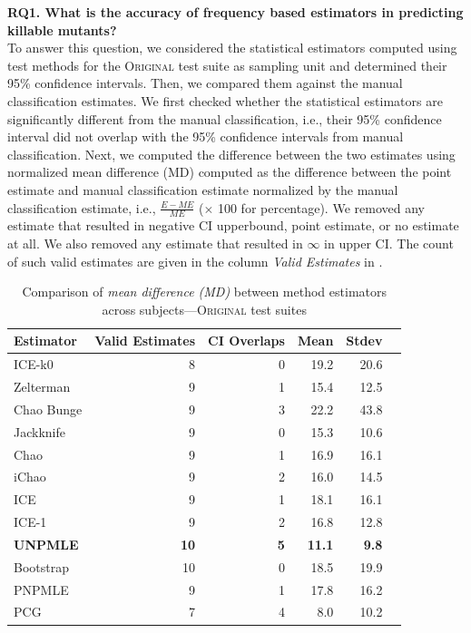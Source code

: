 \documentclass[sigconf,review,anonymous]{acmart}
\newcommand{\ICEallrare}{ICE-k0\xspace}
\newcommand{\Zelterman}{Zelterman\xspace}
\newcommand{\ChaoBunge}{Chao Bunge\xspace}
\newcommand{\Jackknife}{Jackknife\xspace}
\newcommand{\Chao}{Chao\xspace}
\newcommand{\improvedChao}{iChao\xspace}
\newcommand{\ICE}{ICE\xspace}
\newcommand{\improvedICE}{ICE-1\xspace}
\newcommand{\Unpmle}{UNPMLE\xspace}
\newcommand{\Bootstrap}{Bootstrap\xspace}
\newcommand{\Pnpmle}{PNPMLE\xspace}
\newcommand{\PCG}{PCG\xspace}
\newcommand{\original}{\textsc{Original}\xspace}
\newcommand{\B}[1]{\textbf{#1}}
\begin{document}
\noindent\textbf{RQ1.
What is the accuracy of frequency based estimators in predicting killable mutants?}\\
%
To answer this question, we considered the statistical estimators computed
using test methods for the \original test suite as sampling unit and determined
their 95\% confidence intervals. Then, we compared them against the manual
classification estimates.
%
We first checked whether the statistical estimators are significantly different
from the manual classification, i.e.,  their 95\% confidence interval did not overlap
with the 95\% confidence intervals from manual classification. Next, we computed
the difference between the two estimates using normalized mean difference (MD) computed as the
difference between the point estimate and manual classification estimate
normalized by the manual classification estimate, i.e., $\frac{E - ME}{ME}$ ($\times$
100 for percentage). We removed any estimate that resulted in negative
CI upperbound, point estimate, or no estimate at all. We also removed any
estimate that resulted in $\infty$ in upper CI. The count of such valid
estimates are given in the column \emph{Valid Estimates} in .

\begin{table}
\caption{Comparison of \emph{mean difference (MD)} between method estimators
across subjects---\original test suites}
\begin{tabular}{|l|r|r|r|r|r|}
\hline

Estimator	&Valid Estimates	&CI Overlaps	&Mean	&Stdev	\\
\hline
\ICEallrare		&	8	&	0	&19.2	&	20.6\\
\Zelterman		&	9	&	1	&15.4	&	12.5\\
\ChaoBunge		&	9	&	3	&22.2	&	43.8\\
\Jackknife		&	9	&	0	&15.3	&	10.6\\
\Chao	        	&	9	&	1	&16.9	&	16.1\\
\improvedChao		&	9	&	2	&16.0	&	14.5\\
\ICE			&	9	&	1	&18.1	&	16.1\\
\improvedICE		&	9	&	2	&16.8	&	12.8\\
\B{\Unpmle}			&	\B{10}	&	\B{5}	& \B{11.1}	&	\B{9.8}\\
\Bootstrap		&	10	&	0	&18.5	&	19.9\\
\Pnpmle			&	9	&	1	&17.8	&	16.2\\
\PCG			&	7	&	4	&8.0	&	10.2\\
\hline
\end{tabular}
\label{tbl:estoriginal}
\end{table}
\end{document}
